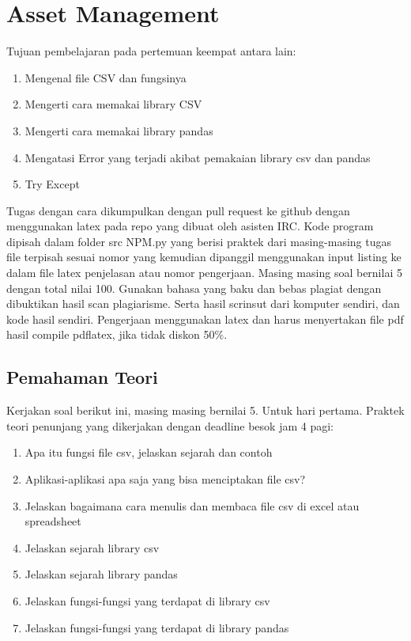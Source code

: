 \chapter{Asset Management}

Tujuan pembelajaran pada pertemuan keempat antara lain:
\begin{enumerate}
\item
Mengenal file CSV dan fungsinya 
\item
Mengerti cara memakai library CSV
\item
Mengerti cara memakai library pandas
\item
Mengatasi Error yang terjadi akibat pemakaian library csv dan pandas
\item
Try Except
\end{enumerate}
Tugas dengan cara dikumpulkan dengan pull request ke github dengan menggunakan latex pada repo yang dibuat oleh asisten IRC. Kode program dipisah dalam folder src NPM.py yang berisi praktek dari masing-masing tugas file terpisah sesuai nomor yang kemudian dipanggil menggunakan input listing ke dalam file latex penjelasan atau nomor pengerjaan. Masing masing soal bernilai 5 dengan total nilai 100. Gunakan bahasa yang baku dan bebas plagiat dengan dibuktikan hasil scan plagiarisme. Serta hasil scrinsut dari komputer sendiri, dan kode hasil sendiri. Pengerjaan menggunakan latex dan harus menyertakan file pdf hasil compile pdflatex, jika tidak diskon 50\%.


\section{Pemahaman Teori}
Kerjakan soal berikut ini, masing masing bernilai 5. Untuk hari pertama.
Praktek teori penunjang yang dikerjakan dengan deadline besok jam 4 pagi:
\begin{enumerate}
\item
Apa itu fungsi file csv, jelaskan sejarah dan contoh
\item
Aplikasi-aplikasi apa saja yang bisa menciptakan file csv?
\item
Jelaskan bagaimana cara menulis dan membaca file csv di excel atau spreadsheet
\item
Jelaskan sejarah library csv
\item
Jelaskan sejarah library pandas
\item
Jelaskan fungsi-fungsi yang terdapat di library csv
\item
Jelaskan fungsi-fungsi yang terdapat di library pandas
\end{enumerate}

